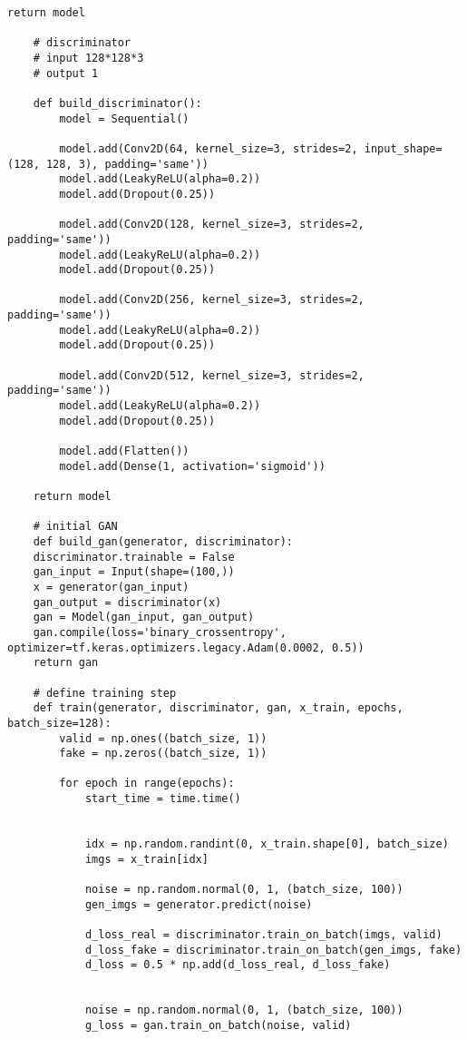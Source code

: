 \begin{lstlisting}[style=mypython, caption=Apply Animal Faces-HQ Dataset]
    return model

    # discriminator
    # input 128*128*3
    # output 1

    def build_discriminator():
        model = Sequential()

        model.add(Conv2D(64, kernel_size=3, strides=2, input_shape=(128, 128, 3), padding='same'))
        model.add(LeakyReLU(alpha=0.2))
        model.add(Dropout(0.25))

        model.add(Conv2D(128, kernel_size=3, strides=2, padding='same'))
        model.add(LeakyReLU(alpha=0.2))
        model.add(Dropout(0.25))

        model.add(Conv2D(256, kernel_size=3, strides=2, padding='same'))
        model.add(LeakyReLU(alpha=0.2))
        model.add(Dropout(0.25))

        model.add(Conv2D(512, kernel_size=3, strides=2, padding='same'))
        model.add(LeakyReLU(alpha=0.2))
        model.add(Dropout(0.25))

        model.add(Flatten())
        model.add(Dense(1, activation='sigmoid'))

    return model

    # initial GAN
    def build_gan(generator, discriminator):
    discriminator.trainable = False
    gan_input = Input(shape=(100,))
    x = generator(gan_input)
    gan_output = discriminator(x)
    gan = Model(gan_input, gan_output)
    gan.compile(loss='binary_crossentropy', optimizer=tf.keras.optimizers.legacy.Adam(0.0002, 0.5))
    return gan

    # define training step
    def train(generator, discriminator, gan, x_train, epochs, batch_size=128):
        valid = np.ones((batch_size, 1))
        fake = np.zeros((batch_size, 1))

        for epoch in range(epochs):
            start_time = time.time()


            idx = np.random.randint(0, x_train.shape[0], batch_size)
            imgs = x_train[idx]

            noise = np.random.normal(0, 1, (batch_size, 100))
            gen_imgs = generator.predict(noise)

            d_loss_real = discriminator.train_on_batch(imgs, valid)
            d_loss_fake = discriminator.train_on_batch(gen_imgs, fake)
            d_loss = 0.5 * np.add(d_loss_real, d_loss_fake)


            noise = np.random.normal(0, 1, (batch_size, 100))
            g_loss = gan.train_on_batch(noise, valid)


\end{lstlisting}
